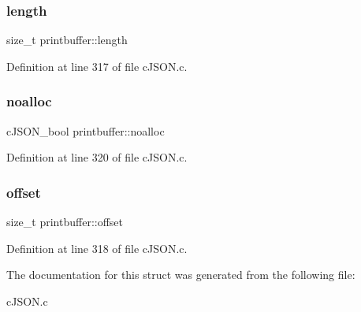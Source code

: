 \subsubsection{\texorpdfstring{length}{length}}
{\footnotesize\ttfamily size\+\_\+t printbuffer\+::length}



Definition at line 317 of file c\+J\+S\+O\+N.\+c.

\mbox{\label{structprintbuffer_aa2a7966b71dc3535e4e3789c33ec5368}} 
\subsubsection{\texorpdfstring{noalloc}{noalloc}}
{\footnotesize\ttfamily c\+J\+S\+O\+N\+\_\+bool printbuffer\+::noalloc}



Definition at line 320 of file c\+J\+S\+O\+N.\+c.

\mbox{\label{structprintbuffer_a3ed6f9d24d6591047680492a962dc7c9}} 
\subsubsection{\texorpdfstring{offset}{offset}}
{\footnotesize\ttfamily size\+\_\+t printbuffer\+::offset}



Definition at line 318 of file c\+J\+S\+O\+N.\+c.



The documentation for this struct was generated from the following file\+:\begin{DoxyCompactItemize}
\item 
c\+J\+S\+O\+N.\+c\end{DoxyCompactItemize}
